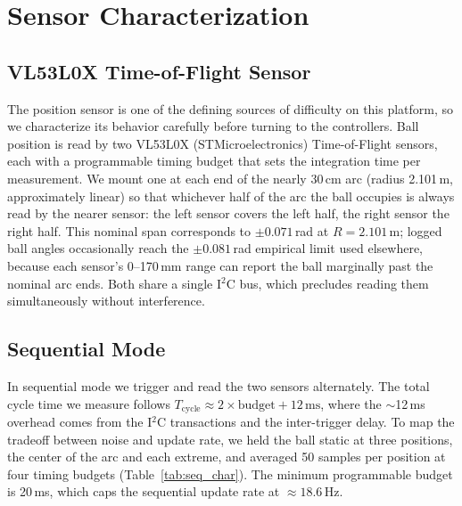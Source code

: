 \section{Sensor Characterization}
\label{appendix:sensor_characterization}


\subsection{VL53L0X Time-of-Flight Sensor}

The position sensor is one of the defining sources of difficulty on this
platform, so we characterize its behavior carefully before turning to the
controllers. Ball position is read by two VL53L0X (STMicroelectronics)
Time-of-Flight sensors, each with a programmable timing budget that sets the
integration time per measurement. We mount one at each end of the nearly
30\,cm arc (radius 2.101\,m, approximately linear) so that whichever half of
the arc the ball occupies is always read by the nearer sensor: the left sensor
covers the left half, the right sensor the right half. This nominal span
corresponds to $\pm 0.071$\,rad at $R = 2.101$\,m; logged ball angles
occasionally reach the $\pm 0.081$\,rad empirical limit used elsewhere,
because each sensor's 0--170\,mm range can report the ball marginally past the
nominal arc ends. Both share a single I$^2$C bus,
which precludes reading them simultaneously without interference.

\subsection{Sequential Mode}

In sequential mode we trigger and read the two sensors alternately. The
total cycle time we measure follows
$T_\text{cycle} \approx 2\times\text{budget} + 12\,\text{ms}$,
where the $\sim$12\,ms overhead comes from the I$^2$C transactions and the
inter-trigger delay. To map the tradeoff between noise and update rate, we
held the ball static at three positions, the center of the arc and each
extreme, and averaged 50 samples per position at four timing budgets
(Table~\ref{tab:seq_char}). The minimum programmable budget is 20\,ms, which
caps the sequential update rate at ${\approx}18.6$\,Hz.

